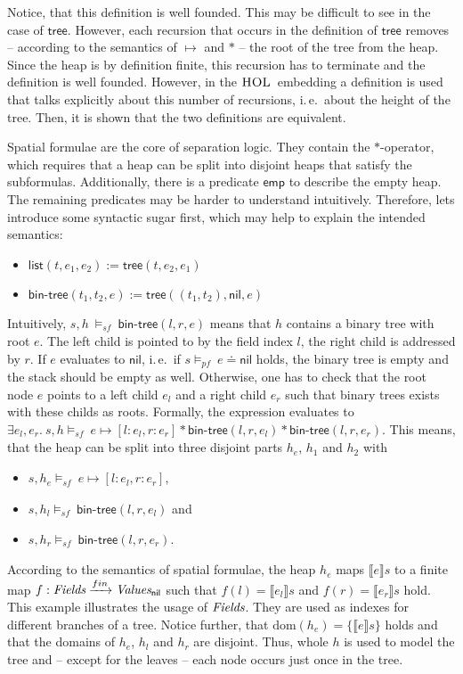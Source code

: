 \documentclass{scrartcl}
\theoremstyle{definition}
\newcommand{\HOL}{{\textsc{HOL}}}
\newcommand{\nil}{{\textsf{nil}}}
\newcommand{\pfequal}[2]{\ensuremath{#1 \doteq #2}}
\newcommand{\values}{{\emph{Values}}}
\newcommand{\valuesnil}{\ensuremath{\values_\nil}}
\newcommand{\fields}{{\emph{Fields}}}
\newcommand{\modelspf}{{\models_{\textit{pf}}\ }}
\newcommand{\modelssf}{{\models_{\textit{sf}}\ }}
\newcommand{\sfemp}{{\textsf{emp}}}
\newcommand{\sftree}{{\textsf{tree}}}
\newcommand{\sfpointsto}[2]{#1 \mapsto [#2]}
\newcommand{\sfbintree}{{\textsf{bin-tree}}}
\newcommand{\sflist}{{\textsf{list}}}
\newcommand{\dom}{{\text{dom}}}
\newcommand{\tofin}{\xrightarrow{fin}}
\begin{document}
Notice, that this definition is well founded. This may be difficult to see in
the case of $\sftree$. However, each recursion that occurs in the definition
of $\sftree$ removes -- according to the semantics of $\mapsto$ and
$*$ -- the root of the tree from the heap. Since the heap is by definition
finite, this recursion has to terminate and the definition is well founded.
However, in the $\HOL$\ embedding a definition is used that talks explicitly
about this number of recursions, i.\,e.\ about the height of the tree. Then, it
is shown that the two definitions are equivalent.
\bigskip

Spatial formulae are the core of separation logic. They contain the
$*$-operator, which requires that a heap can be split into disjoint heaps
that satisfy the subformulas. Additionally, there is a predicate $\sfemp$ to
describe the empty heap. The remaining predicates may be harder to understand
intuitively. Therefore, lets introduce some syntactic sugar first, which may
help to explain the intended semantics:

\begin{itemize}
\item $\sflist(t,e_1,e_2) := \sftree(t,e_2,e_1)$
\item $\sfbintree(t_1,t_2,e) := \sftree((t_1,t_2),\nil,e)$
\end{itemize}

Intuitively, $s, h\ \modelssf \sfbintree(l,r,e)$ means that $h$ contains a
binary tree with root $e$. The left child is pointed to by the field
index $l$, the right child is addressed by $r$. If $e$ evaluates to $\nil$,
i.\,e.\ if $s \modelspf \pfequal e \nil$ holds, the binary tree is empty and
the stack should be empty as well. Otherwise, one has to check
that the root node $e$ points to a left child $e_l$ and a right child $e_r$ such that
binary trees exists with these childs as roots. Formally, the expression evaluates to
$\exists e_l,e_r.\ s, h \modelssf \sfpointsto{e}{l:e_l, r:e_r} *
\sfbintree(l,r,e_l) * \sfbintree(l,r,e_r)$. This means, that the heap can be
split into three disjoint parts $h_e$, $h_1$ and $h_2$ with
\begin{itemize}
  \item $s, h_e \modelssf \sfpointsto{e}{l:e_l, r:e_r}$,
  \item $s, h_l \modelssf \sfbintree(l,r,e_l)$ and
  \item $s, h_r \modelssf \sfbintree(l,r,e_r)$.
\end{itemize}
According to the semantics of spatial formulae, the heap $h_e$ maps $\llbracket e
\rrbracket s$ to a finite map $f:\fields \tofin \valuesnil$ such that
$f(l) = \llbracket e_l \rrbracket s$ and $f(r) = \llbracket e_r \rrbracket
s$ hold. This example illustrates the usage of $\fields$. They are used
as indexes for different branches of a tree. Notice further, that $\dom(h_e) =
\{\llbracket e \rrbracket s\}$ holds and that the domains of $h_e$, $h_l$ and $h_r$
are disjoint. Thus, whole $h$ is used to model the tree and -- except for the
leaves -- each node occurs just once in the tree.
\end{document}
